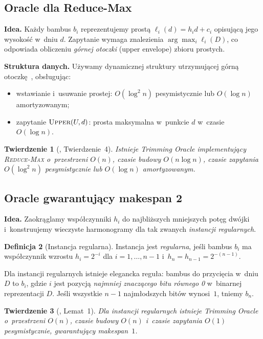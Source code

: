 \documentclass[12pt,a4paper]{article}
\theoremstyle{plain}
\newtheorem{twierdzenie}{Twierdzenie}[section]
\theoremstyle{definition}
\newtheorem{definicja}[twierdzenie]{Definicja}
\theoremstyle{remark}
\newcommand{\RM}{\textsc{Reduce-Max}}
\begin{document}
\subsection{Oracle dla Reduce-Max}

\textbf{Idea.} Każdy bambus $b_i$ reprezentujemy prostą $\ell_i(d) = h_i d + c_i$
opisującą jego wysokość w~dniu $d$. Zapytanie wymaga znalezienia
$\arg\max_i \ell_i(D)$, co odpowiada obliczeniu \emph{górnej otoczki}
(upper envelope) zbioru prostych.

\textbf{Struktura danych.} Używamy dynamicznej struktury utrzymującej
górną otoczkę~\cite{overmars1981, brodal2002}, obsługując:
\begin{itemize}[noitemsep]
  \item wstawianie i~usuwanie prostej: $O(\log^2 n)$ pesymistycznie
        lub $O(\log n)$ amortyzowanym;
  \item zapytanie $\textsc{Upper}(U, d)$: prosta maksymalna w~punkcie $d$
        w~czasie $O(\log n)$.
\end{itemize}

\begin{twierdzenie}[\cite{bilo2022}, Twierdzenie~4]\label{thm:oracle-rm}
Istnieje Trimming Oracle implementujący \RM{} o~przestrzeni $O(n)$,
czasie budowy $O(n \log n)$, czasie zapytania $O(\log^2 n)$ pesymistycznie
lub $O(\log n)$ amortyzowanym.
\end{twierdzenie}

\subsection{Oracle gwarantujący makespan 2}

\textbf{Idea.} Zaokrąglamy współczynniki $h_i$ do najbliższych mniejszych
potęg dwójki i~konstruujemy wieczyste harmonogramy dla tak zwanych \emph{instancji
regularnych}.

\begin{definicja}[Instancja regularna]
Instancja jest \emph{regularna}, jeśli bambus $b_i$ ma współczynnik wzrostu
$h_i = 2^{-i}$ dla $i = 1, \ldots, n-1$ i~$h_n = h_{n-1} = 2^{-(n-1)}$.
\end{definicja}

Dla instancji regularnych istnieje elegancka reguła: bambus do przycięcia
w~dniu $D$ to $b_i$, gdzie $i$ jest pozycją \emph{najmniej znaczącego bitu
równego 0} w~binarnej reprezentacji $D$. Jeśli wszystkie $n-1$ najmłodszych
bitów wynosi~$1$, tniemy $b_n$.

\begin{twierdzenie}[\cite{bilo2022}, Lemat~1]
Dla instancji regularnych istnieje Trimming Oracle o~przestrzeni $O(n)$,
czasie budowy $O(n)$ i~czasie zapytania $O(1)$ pesymistycznie,
gwarantujący makespan~$1$.
\end{twierdzenie}
\end{document}
